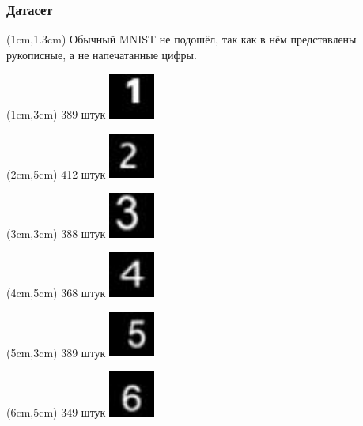 \documentclass{beamer}
\begin{document}
\begin{frame}
\frametitle{Датасет}
\begin{textblock*}{10cm}(1cm,1.3cm)
Обычный MNIST не подошёл, так как в нём представлены рукописные, а не напечатанные цифры.
\end{textblock*}

\begin{textblock*}{1.5cm}(1cm,3cm)
\tiny 389 штук
\includegraphics[width=1.5cm]{1_00112}
\end{textblock*}

\begin{textblock*}{1.5cm}(2cm,5cm)
\tiny 412 штук
\includegraphics[width=1.5cm]{2_00163}
\end{textblock*}

\begin{textblock*}{1.5cm}(3cm,3cm)
\tiny 388 штук
\includegraphics[width=1.5cm]{3_00108}
\end{textblock*}

\begin{textblock*}{1.5cm}(4cm,5cm)
\tiny 368 штук
\includegraphics[width=1.5cm]{4_00114}
\end{textblock*}

\begin{textblock*}{1.5cm}(5cm,3cm)
\tiny 389 штук
\includegraphics[width=1.5cm]{5_00063}
\end{textblock*}

\begin{textblock*}{1.5cm}(6cm,5cm)
\tiny 349 штук
\includegraphics[width=1.5cm]{6_00059}
\end{textblock*}


\end{frame}
\end{document}
